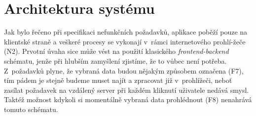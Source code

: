\documentclass[thesis=B,czech]{FITthesis}[2012/06/26]
\begin{document}

\section{Architektura systému}
Jak bylo řečeno při specifikaci nefunkčních požadavků, aplikace poběží pouze na klientské straně a veškeré procesy se vykonají v~rámci internetového prohlí-žeče (N2). Prvotní úvaha sice může vést na použití klasického \textit{frontend-backend} schématu, jenže při hlubším zamyšlení zjistíme, že to vůbec není potřeba. Z~požadavků plyne, že vybraná data budou nějakým způsobem označena (F7), tím pádem je stejně budeme muset najít a zpracovat již v~prohlížeči, neboť zasílat požadavek na vzdálený server při každém kliknutí uživatele nedává smysl. Taktéž možnost kdykoli si momentálně vybraná data prohlédnout (F8) nenahrává tomuto schématu.
\end{document}
